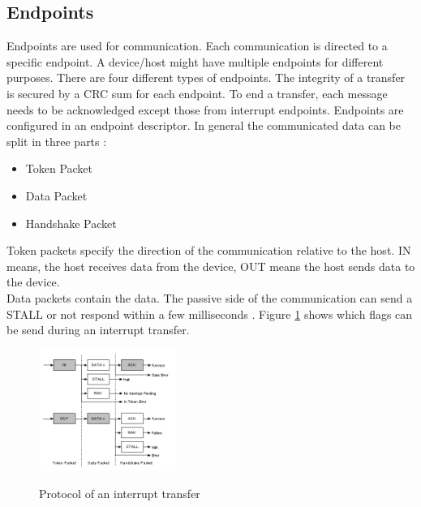 \documentclass{acm_proc_article-sp}
\begin{document}
\subsection{Endpoints}
Endpoints are used for communication.
Each communication is directed to a specific endpoint.
A device/host might have multiple endpoints for different purposes.
There are four different types of endpoints.
The integrity of a transfer is secured by a CRC sum for each endpoint.
To end a transfer, each message needs to be acknowledged except those from interrupt endpoints.
Endpoints are configured in an endpoint descriptor.
In general the communicated data can be split in three parts \cite{beyond}:
\begin{itemize}
\item Token Packet
\item Data Packet
\item Handshake Packet
\end{itemize}
Token packets specify the direction of the communication relative to the host.
IN means, the host receives data from the device, OUT means the host sends data to the device.\\
Data packets contain the data.
The passive side of the communication can send a STALL or not respond within a few milliseconds
\cite{beyond}.
Figure \ref{fig:interrupttransfer} shows which flags can be send during an interrupt transfer.

\begin{figure}[!h]
\centering
\includegraphics[width=0.4\textwidth]{interrupttransfer.png}
\label{fig:interrupttransfer}
\caption{Protocol of an interrupt transfer \cite{beyond}}
\end{figure}
\end{document}
